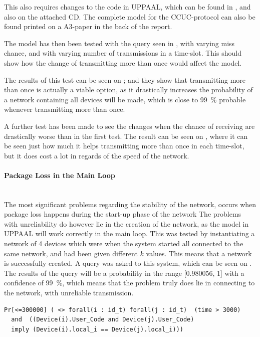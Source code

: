 This also requires changes to the code in UPPAAL, which can be found in , and also on the attached CD.
The complete model for the CCUC-protocol can also be found printed on a A3-paper in the back of the report.

The model has then been tested with the query seen in , with varying miss chance, and with varying number of transmissions in a time-slot.
This should show how the change of transmitting more than once would affect the model.

The results of this test can be seen on ; and they show that transmitting more than once is actually a viable option, as it drastically increases the probability of a network containing all devices will be made, which is close to 99~\% probable whenever transmitting more than once.

A further test has been made to see the changes when the chance of receiving are drastically worse than in the first test.
The result can be seen on , where it can be seen just how much it helps transmitting more than once in each time-slot, but it does cost a lot in regards of the speed of the network.

\paragraph{Package Loss in the Main Loop}\hfill \\
The most significant problems regarding the stability of the network, occurs when package loss happens during the start-up phase of the network
The problems with unreliability do however lie in the creation of the network, as the model in UPPAAL will work correctly in the main loop.
This was tested by instantiating a network of 4 devices which were when the system started all connected to the same network, and had been given different $k$ values. 
This means that a network is successfully created.
A query was asked to this system, which can be seen on .
The results of the query will be a probability in the range [0.980056, 1] with a confidence of 99~\%, which means that the problem truly does lie in connecting to the network, with unreliable transmission. 

\begin{lstlisting}[style=UPPAAL, caption={Query for UPPAAL asking if for all devices i and j, when they are in the location \texttt{User\_Code} will they have they then have the same value for \texttt{local\_i}.}, label={stable-network-query}, float=p]
Pr[<=300000] ( <> forall(i : id_t) forall(j : id_t)  (time > 3000) 
  and  ((Device(i).User_Code and Device(j).User_Code) 
  imply (Device(i).local_i == Device(j).local_i)))
\end{lstlisting} 
 
